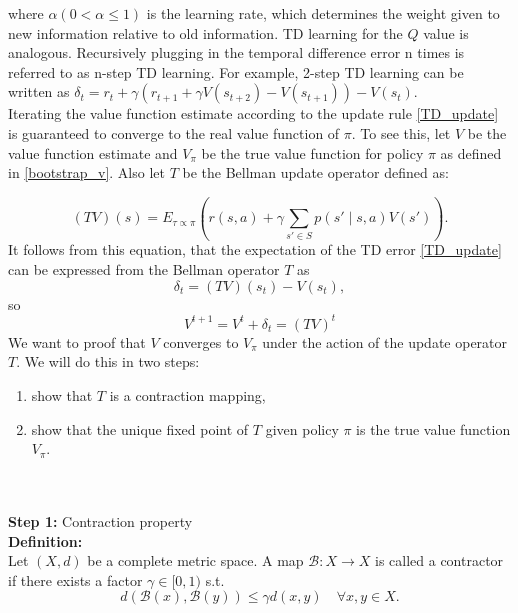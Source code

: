 where $\alpha (0 < \alpha \leq 1)$ is the learning rate, which determines the weight given to new information relative to old information. TD learning for the $Q$ 
value is analogous. Recursively plugging in the temporal difference error n times is referred to as n-step TD learning. For example, 2-step TD learning can be written as 
$\delta_t = r_t + \gamma (r_{t+1} + \gamma V(s_{t+2}) - V(s_{t+1})  ) - V(s_t)$.\\

Iterating the value function estimate according to the update rule \ref{TD_update} is guaranteed to converge to the real value function of $\pi$. To see this, 
let $V$ be the value function estimate and $V_{\pi}$ be the true value function for policy $\pi$ as defined in \ref{bootstrap_v}. Also let $T$ be the 
Bellman update operator defined as:

\begin{equation}
    (T V)(s) = E_{\tau \propto \pi} \left(r(s,a) + \gamma \sum_{s' \in S} p(s' \mid s,a) V(s')\right).
\end{equation}
It follows from this equation, that the expectation of the TD error \ref{TD_update} can be expressed from the Bellman operator $T$ as 
\begin{equation}
    \label{TD_update_BM}
    \delta_t = (T V)(s_t) - V(s_t),
\end{equation} 
so 
\begin{equation*}
    V^{t+1} = V^t + \delta_t = (T V)^t
\end{equation*}
We want to proof that $V$ converges to $V_{\pi}$ under the action of the update operator $T$. We will do this in two steps:
\begin{enumerate}
    \item show that $T$ is a contraction mapping,
    \item show that the unique fixed point of $T$ given policy $\pi$ is the true value function $V_{\pi}$.
\end{enumerate}
\\ \\

\textbf{Step 1:} Contraction property\\
\textbf{Definition:}\\
Let $(X, d)$ be a complete metric space. A map $\mathcal{B}:X \rightarrow X$ is called a contractor if there exists a factor $\gamma \in [0, 1)$ s.t.
\begin{equation}
    d(\mathcal{B}(x), \mathcal{B}(y)) \leq \gamma d(x,y) \quad \forall x,y \in X.
\end{equation}
\\ \\

